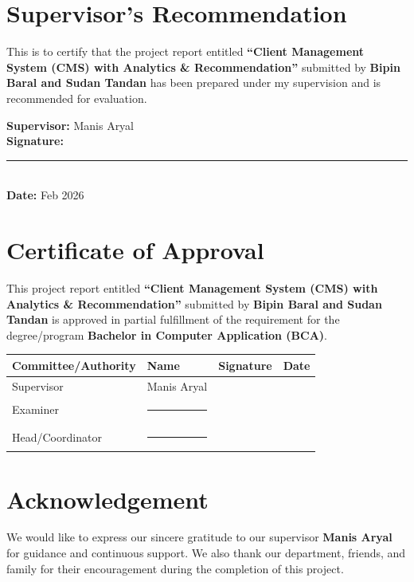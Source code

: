 \documentclass[12pt,a4paper]{report}
\newcommand{\SubmittedBy}{Bipin Baral and Sudan Tandan}
\newcommand{\ProgramName}{Bachelor in Computer Application (BCA)}
\newcommand{\SupervisorName}{Manis Aryal}
\newcommand{\SubmissionDate}{Feb 2026}
\begin{document}
\chapter*{Supervisor's Recommendation}
This is to certify that the project report entitled \textbf{``Client Management System (CMS) with Analytics \& Recommendation''} submitted by \textbf{\SubmittedBy} has been prepared under my supervision and is recommended for evaluation.

\vspace{1cm}
\noindent \textbf{Supervisor:} \SupervisorName\\
\textbf{Signature:} \rule{6cm}{0.4pt}\\
\textbf{Date:} \SubmissionDate

\chapter*{Certificate of Approval}
This project report entitled \textbf{``Client Management System (CMS) with Analytics \& Recommendation''} submitted by \textbf{\SubmittedBy} is approved in partial fulfillment of the requirement for the degree/program \textbf{\ProgramName}.

\vspace{0.6cm}
\begin{longtable}{@{}p{4.2cm}p{5.0cm}p{3.5cm}p{2.2cm}@{}}
\toprule
\textbf{Committee/Authority} & \textbf{Name} & \textbf{Signature} & \textbf{Date} \\
\midrule
Supervisor & \SupervisorName &  &  \\
Examiner & \rule{4.5cm}{0.4pt} &  &  \\
Head/Coordinator & \rule{4.5cm}{0.4pt} &  &  \\
\bottomrule
\end{longtable}

\chapter*{Acknowledgement}
We would like to express our sincere gratitude to our supervisor \textbf{\SupervisorName} for guidance and continuous support. We also thank our department, friends, and family for their encouragement during the completion of this project.
\end{document}
